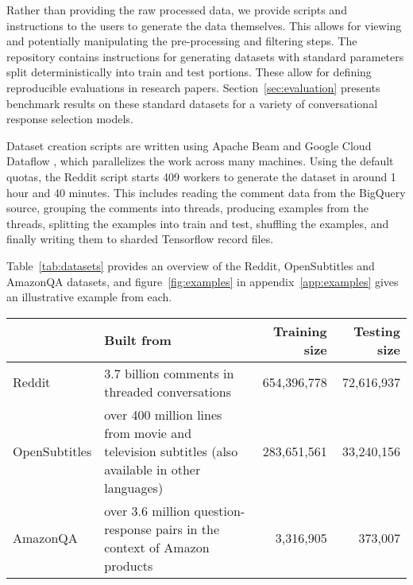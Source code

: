 \documentclass[11pt,a4paper,table]{article}
\begin{document}
Rather than providing the raw processed data, we provide scripts and instructions to the users to generate the data themselves. This allows for viewing and potentially manipulating the pre-processing and filtering steps. The repository contains instructions for generating datasets with standard parameters split deterministically into train and test portions. These allow for defining reproducible evaluations in research papers. Section~\ref{sec:evaluation} presents benchmark results on these standard datasets for a variety of conversational response selection models.

Dataset creation scripts are written using Apache Beam and Google Cloud Dataflow \cite{Akidau2015}, which parallelizes the work across many machines. Using the default quotas, the Reddit script starts 409 workers to generate the dataset in around 1 hour and 40 minutes. This includes reading the comment data from the BigQuery source, grouping the comments into threads, producing examples from the threads, splitting the examples into train and test, shuffling the examples, and finally writing them to sharded Tensorflow record files.

Table~\ref{tab:datasets} provides an overview of the Reddit, OpenSubtitles and AmazonQA datasets, and figure~\ref{fig:examples} in appendix~\ref{app:examples} gives an illustrative example from each.



\begin{table*}[hbt]
    \centering
    {
        \small
        \begin{tabularx}{0.85 \textwidth}{p{18mm} p{58mm} r r}
            \toprule
             & \textbf{Built from} & \textbf{Training size} & \textbf{Testing size} \\
             \midrule
             {Reddit} &  3.7 billion comments in threaded conversations & 654,396,778 & 72,616,937 \\
             {OpenSubtitles} & over 400 million lines from movie and television subtitles (also available in other languages) &  283,651,561 & 33,240,156 \\
             {AmazonQA} &  over 3.6 million question-response pairs in the context of Amazon products  & 3,316,905 & 373,007 \\
             \bottomrule
        \end{tabularx}
    }
\caption{
        Summary of the datasets included in the public repository. The Reddit data is taken from January 2015 to December 2018, and the OpenSubtitles data from 2018.
    }
    \label{tab:datasets}
\end{table*}
\end{document}
